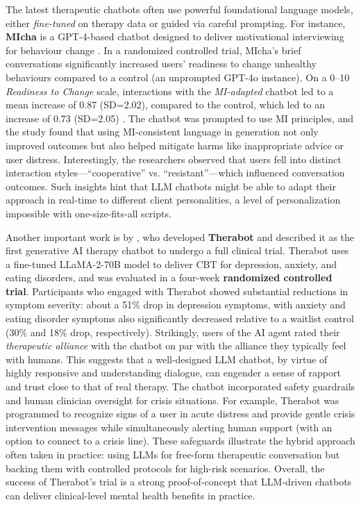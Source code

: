 The latest therapeutic chatbots often use powerful foundational language models, either
\emph{fine-tuned} on therapy data or guided via careful prompting. For instance,
\textbf{MIcha} is a GPT-4-based chatbot designed to deliver motivational interviewing
for behaviour change \cite{Meyer2025}. In a randomized controlled trial, MIcha's brief
conversations significantly increased users' readiness to change unhealthy behaviours
compared to a control (an unprompted GPT-4o instance). On a 0--10 \emph{Readiness to
	Change} \cite{BienerAbrams1991} scale, interactions with the \emph{MI-adapted} chatbot
led to a mean increase of 0.87 (SD=2.02), compared to the control, which led to an
increase of 0.73 (SD=2.05) \cite{Meyer2025}. The chatbot was prompted to use MI
principles, and the study found that using MI-consistent language in generation not
only improved outcomes but also helped mitigate harms like inappropriate advice or user
distress. Interestingly, the researchers observed that users fell into distinct
interaction styles---``cooperative'' vs. ``resistant''---which influenced conversation
outcomes. Such insights hint that LLM chatbots might be able to adapt their approach in
real-time to different client personalities, a level of personalization impossible with
one-size-fits-all scripts.

Another important work is by \citet{doi:10.1056/AIoa2400802}, who developed
\textbf{Therabot} and described it as the first generative AI therapy chatbot to
undergo a full clinical trial. Therabot uses a fine-tuned LLaMA-2-70B model to deliver
CBT for depression, anxiety, and eating disorders, and was evaluated in a four-week
\textbf{randomized controlled trial}. Participants who engaged with Therabot showed
substantial reductions in symptom severity: about a 51\% drop in depression symptoms,
with anxiety and eating disorder symptoms also significantly decreased relative to a
waitlist control (30\% and 18\% drop, respectively). Strikingly, users of the AI agent
rated their \emph{therapeutic alliance} with the chatbot on par with the alliance they
typically feel with humans. This suggests that a well-designed LLM chatbot, by virtue
of highly responsive and understanding dialogue, can engender a sense of rapport and
trust close to that of real therapy. The chatbot incorporated safety guardrails and
human clinician oversight for crisis situations. For example, Therabot was programmed
to recognize signs of a user in acute distress and provide gentle crisis intervention
messages while simultaneously alerting human support (with an option to connect to a
crisis line). These safeguards illustrate the hybrid approach often taken in practice:
using LLMs for free-form therapeutic conversation but backing them with controlled
protocols for high-risk scenarios. Overall, the success of Therabot’s trial is a strong
proof-of-concept that LLM-driven chatbots can deliver clinical-level mental health
benefits in practice.

